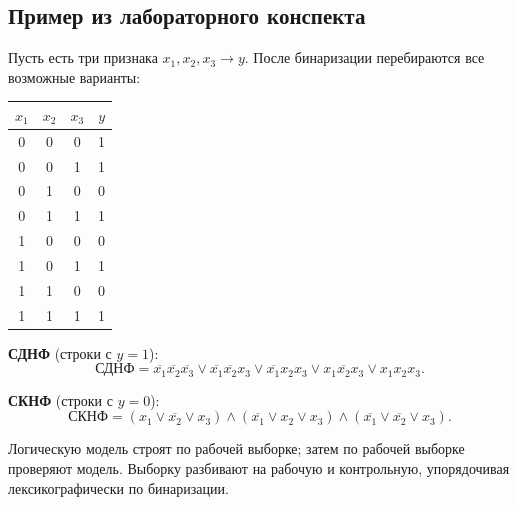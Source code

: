 \subsection*{Пример из лабораторного конспекта}

Пусть есть три признака $x_1,x_2,x_3 \to y$. После бинаризации перебираются все возможные варианты:

\begin{center}
\begin{tabular}{ccc|c}
  \hline
  $x_1$ & $x_2$ & $x_3$ & $y$ \\
  \hline
  0 & 0 & 0 & 1 \\
  0 & 0 & 1 & 1 \\
  0 & 1 & 0 & 0 \\
  0 & 1 & 1 & 1 \\
  1 & 0 & 0 & 0 \\
  1 & 0 & 1 & 1 \\
  1 & 1 & 0 & 0 \\
  1 & 1 & 1 & 1 \\
  \hline
\end{tabular}
\end{center}

\textbf{СДНФ} (строки с $y=1$):
\[
  \text{СДНФ} =
  \overline{x_1}\overline{x_2}\overline{x_3}
  \lor \overline{x_1}\overline{x_2}x_3
  \lor \overline{x_1}x_2x_3
  \lor x_1\overline{x_2}x_3
  \lor x_1x_2x_3.
\]

\textbf{СКНФ} (строки с $y=0$):
\[
  \text{СКНФ} =
  (x_1 \lor \overline{x_2} \lor x_3)
  \land (\overline{x_1} \lor x_2 \lor x_3)
  \land (\overline{x_1} \lor \overline{x_2} \lor x_3).
\]

Логическую модель строят по рабочей выборке; затем по рабочей выборке проверяют модель. Выборку разбивают на рабочую и контрольную, упорядочивая лексикографически по бинаризации.

\clearpage
